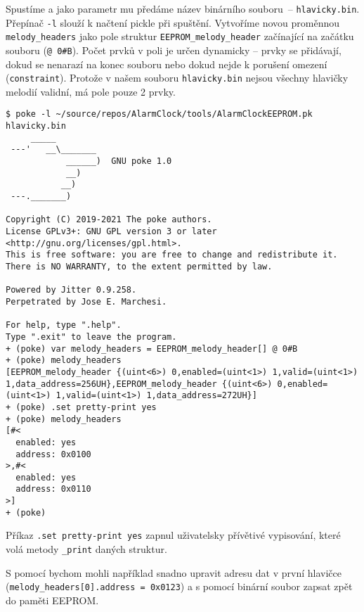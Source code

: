 Spustíme  a jako parametr mu předáme název binárního souboru~--
\texttt{hlavicky.bin}. Přepínač \texttt{-l} slouží k načtení pickle při
spuštění. Vytvoříme novou proměnnou \verb|melody_headers| jako pole struktur
\verb|EEPROM_melody_header| začínající na začátku souboru (\verb|@ 0#B|). Počet
prvků v poli je určen dynamicky -- prvky se přidávají, dokud se nenarazí na
konec souboru nebo dokud nejde k porušení omezení (\texttt{constraint}).
Protože v našem souboru \texttt{hlavicky.bin} nejsou všechny hlavičky melodií
validní, má pole pouze 2 prvky.
\begin{lstlisting}[style=terminal]
$ poke -l ~/source/repos/AlarmClock/tools/AlarmClockEEPROM.pk hlavicky.bin
     _____
 ---'   __\_______
            ______)  GNU poke 1.0
            __)
           __)
 ---._______)

Copyright (C) 2019-2021 The poke authors.
License GPLv3+: GNU GPL version 3 or later <http://gnu.org/licenses/gpl.html>.
This is free software: you are free to change and redistribute it.
There is NO WARRANTY, to the extent permitted by law.

Powered by Jitter 0.9.258.
Perpetrated by Jose E. Marchesi.

For help, type ".help".
Type ".exit" to leave the program.
+ (poke) var melody_headers = EEPROM_melody_header[] @ 0#B
+ (poke) melody_headers
[EEPROM_melody_header {(uint<6>) 0,enabled=(uint<1>) 1,valid=(uint<1>) 1,data_address=256UH},EEPROM_melody_header {(uint<6>) 0,enabled=(uint<1>) 1,valid=(uint<1>) 1,data_address=272UH}]
+ (poke) .set pretty-print yes
+ (poke) melody_headers
[#<
  enabled: yes
  address: 0x0100
>,#<
  enabled: yes
  address: 0x0110
>]
+ (poke)
\end{lstlisting}
Příkaz \verb|.set pretty-print yes| zapnul uživatelsky přívětivé vypisování,
které volá metody \verb|_print| daných struktur.

S pomocí  bychom mohli například snadno upravit adresu dat
v první hlavičce (\lstinline[language=Poke]|melody_headers[0].address = 0x0123|)
a s pomocí  binární soubor zapsat zpět do paměti
EEPROM.


